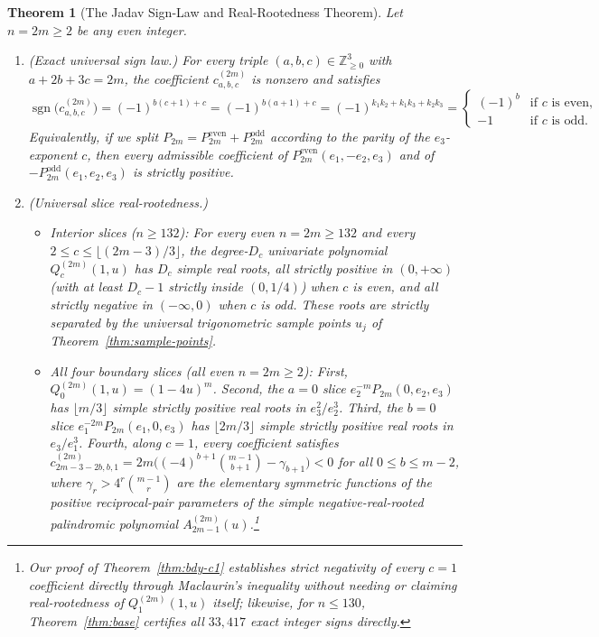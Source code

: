 \documentclass[10pt]{article}
\numberwithin{equation}{section}
\theoremstyle{plain}
\newtheorem{theorem}{Theorem}[section]
\theoremstyle{definition}
\newcommand{\Z}{\mathbb{Z}}
\newcommand{\1}{\mathbf{1}}
\DeclareMathOperator{\sgn}{sgn}
\begin{document}
\begin{theorem}[The Jadav Sign-Law and Real-Rootedness Theorem]\label{thm:main}
Let $n = 2m \ge 2$ be any even integer.
\begin{enumerate}[label=\textup{(\arabic*)}]
    \item \textup{(Exact universal sign law.)} For every triple $(a, b, c) \in \Z_{\ge 0}^3$ with $a + 2b + 3c = 2m$, the coefficient $c_{a,b,c}^{(2m)}$ is nonzero and satisfies
    \begin{equation}\label{eq:sign-law}
    \sgn\!\bigl(c_{a,b,c}^{(2m)}\bigr)
    = (-1)^{b(c+1)+c}
    = (-1)^{b(a+1)+c}
    = (-1)^{k_1 k_2 + k_1 k_3 + k_2 k_3}
    = \begin{cases} (-1)^b & \text{if } c \text{ is even,} \\ -1 & \text{if } c \text{ is odd.} \end{cases}
    \end{equation}
    Equivalently, if we split $P_{2m} = P_{2m}^{\mathrm{even}} + P_{2m}^{\mathrm{odd}}$ according to the parity of the $e_3$-exponent $c$, then every admissible coefficient of $P_{2m}^{\mathrm{even}}(e_1, -e_2, e_3)$ and of $-P_{2m}^{\mathrm{odd}}(e_1, e_2, e_3)$ is strictly positive.

    \item \textup{(Universal slice real-rootedness.)}
    \begin{itemize}[leftmargin=1.5em]
        \item \emph{Interior slices ($n \ge 132$):} For every even $n = 2m \ge 132$ and every $2 \le c \le \lfloor (2m-3)/3 \rfloor$, the degree-$D_c$ univariate polynomial $Q_c^{(2m)}(1, u)$ has $D_c$ \emph{simple real roots}, all strictly positive in $(0, +\infty)$ (with at least $D_c - 1$ strictly inside $(0, 1/4)$) when $c$ is even, and all strictly negative in $(-\infty, 0)$ when $c$ is odd. These roots are strictly separated by the universal trigonometric sample points $u_j$ of Theorem~\ref{thm:sample-points}.
        \item \emph{All four boundary slices (all even $n = 2m \ge 2$):} First, $Q_0^{(2m)}(1, u) = (1 - 4u)^m$. Second, the $a = 0$ slice $e_2^{-m} P_{2m}(0, e_2, e_3)$ has $\lfloor m/3 \rfloor$ simple strictly positive real roots in $e_3^2/e_2^3$. Third, the $b = 0$ slice $e_1^{-2m} P_{2m}(e_1, 0, e_3)$ has $\lfloor 2m/3 \rfloor$ simple strictly positive real roots in $e_3/e_1^3$. Fourth, along $c = 1$, every coefficient satisfies $c_{2m-3-2b, b, 1}^{(2m)} = 2m\bigl((-4)^{b+1}\binom{m-1}{b+1} - \gamma_{b+1}\bigr) < 0$ for all $0 \le b \le m - 2$, where $\gamma_r > 4^r\binom{m-1}{r}$ are the elementary symmetric functions of the positive reciprocal-pair parameters of the simple negative-real-rooted palindromic polynomial $A_{2m-1}^{(2m)}(u)$.\footnote{Our proof of Theorem~\ref{thm:bdy-c1} establishes strict negativity of every $c = 1$ coefficient directly through Maclaurin's inequality without needing or claiming real-rootedness of $Q_1^{(2m)}(1, u)$ itself; likewise, for $n \le 130$, Theorem~\ref{thm:base} certifies all $33{,}417$ exact integer signs directly.}
    \end{itemize}
\end{enumerate}
\end{theorem}
\end{document}
